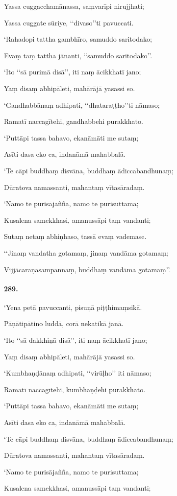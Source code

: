 Yassa cuggacchamānassa, saṃvarīpi nirujjhati;

Yassa cuggate sūriye, ‘‘divaso’’ti pavuccati.

‘Rahadopi tattha gambhīro, samuddo saritodako;

Evaṃ taṃ tattha jānanti, ‘‘samuddo saritodako’’.

‘Ito ‘‘sā purimā disā’’, iti naṃ ācikkhatī jano;

Yaṃ disaṃ abhipāleti, mahārājā yasassi so.

‘Gandhabbānaṃ adhipati, ‘‘dhataraṭṭho’’ti nāmaso;

Ramatī naccagītehi, gandhabbehi purakkhato.

‘Puttāpi tassa bahavo, ekanāmāti me sutaṃ;

Asīti dasa eko ca, indanāmā mahabbalā.

‘Te cāpi buddhaṃ disvāna, buddhaṃ ādiccabandhunaṃ;

Dūratova namassanti, mahantaṃ vītasāradaṃ.

‘Namo te purisājañña, namo te purisuttama;

Kusalena samekkhasi, amanussāpi taṃ vandanti;

Sutaṃ netaṃ abhiṇhaso, tassā evaṃ vademase.

‘‘Jinaṃ vandatha gotamaṃ, jinaṃ vandāma gotamaṃ;

Vijjācaraṇasampannaṃ, buddhaṃ vandāma gotamaṃ’’.

\paragraph{289.} ‘Yena petā pavuccanti, pisuṇā piṭṭhimaṃsikā.

Pāṇātipātino luddā, corā nekatikā janā.

‘Ito ‘‘sā dakkhiṇā disā’’, iti naṃ ācikkhatī jano;

Yaṃ disaṃ abhipāleti, mahārājā yasassi so.

‘Kumbhaṇḍānaṃ adhipati, ‘‘virūḷho’’ iti nāmaso;

Ramatī naccagītehi, kumbhaṇḍehi purakkhato.

‘Puttāpi tassa bahavo, ekanāmāti me sutaṃ;

Asīti dasa eko ca, indanāmā mahabbalā.

‘Te cāpi buddhaṃ disvāna, buddhaṃ ādiccabandhunaṃ;

Dūratova namassanti, mahantaṃ vītasāradaṃ.

‘Namo te purisājañña, namo te purisuttama;

Kusalena samekkhasi, amanussāpi taṃ vandanti;

